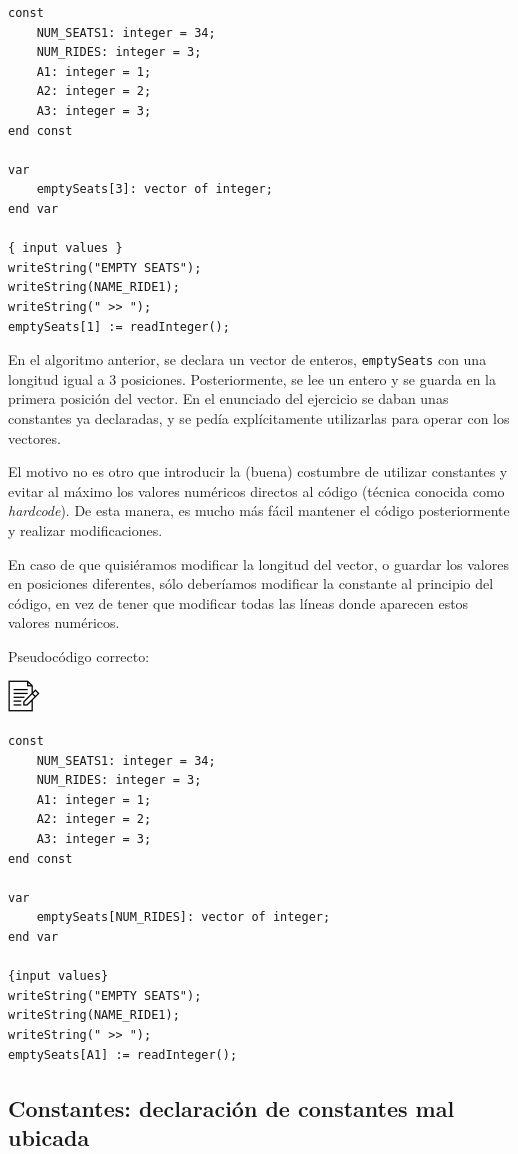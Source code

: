 \documentclass[
]{book}
\begin{document}
\begin{verbatim}
const 
    NUM_SEATS1: integer = 34;
    NUM_RIDES: integer = 3;
    A1: integer = 1;
    A2: integer = 2;
    A3: integer = 3;
end const

var
    emptySeats[3]: vector of integer;
end var

{ input values }
writeString("EMPTY SEATS");
writeString(NAME_RIDE1);
writeString(" >> ");
emptySeats[1] := readInteger();
\end{verbatim}

En el algoritmo anterior, se declara un vector de enteros, \texttt{emptySeats} con una longitud igual a 3 posiciones. Posteriormente, se lee un entero y se guarda en la primera posición del vector. En el enunciado del ejercicio se daban unas constantes ya declaradas, y se pedía explícitamente utilizarlas para operar con los vectores.

El motivo no es otro que introducir la (buena) costumbre de utilizar constantes y evitar al máximo los valores numéricos directos al código (técnica conocida como \emph{hardcode}). De esta manera, es mucho más fácil mantener el código posteriormente y realizar modificaciones.

En caso de que quisiéramos modificar la longitud del vector, o guardar los valores en posiciones diferentes, sólo deberíamos modificar la constante al principio del código, en vez de tener que modificar todas las líneas donde aparecen estos valores numéricos.

Pseudocódigo correcto:

\includegraphics{./img/alg.png}

\begin{verbatim}
const 
    NUM_SEATS1: integer = 34;
    NUM_RIDES: integer = 3;
    A1: integer = 1;
    A2: integer = 2;
    A3: integer = 3;
end const

var
    emptySeats[NUM_RIDES]: vector of integer;
end var

{input values}
writeString("EMPTY SEATS");
writeString(NAME_RIDE1);
writeString(" >> ");
emptySeats[A1] := readInteger();
\end{verbatim}

\hypertarget{constantes-declaraciuxf3n-de-constantes-mal-ubicada}{%
\subsection{Constantes: declaración de constantes mal ubicada}\label{constantes-declaraciuxf3n-de-constantes-mal-ubicada}}
\end{document}
